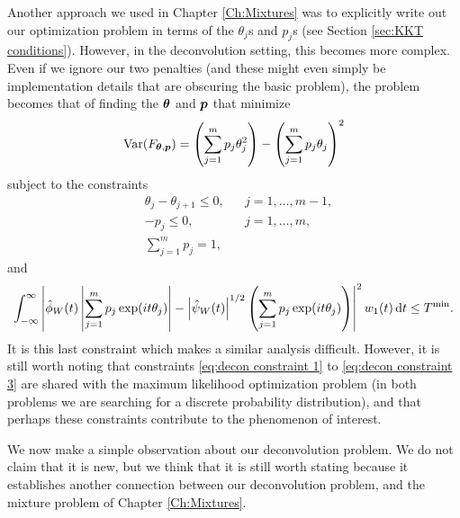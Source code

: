 Another approach we used in Chapter \ref{Ch:Mixtures} was to explicitly write out our optimization problem in terms of the $\theta_j$s and $p_j$s (see Section \ref{sec:KKT conditions}). However, in the deconvolution setting, this becomes more complex. Even if we ignore our two penalties (and these might even simply be implementation details that are obscuring the basic problem), the problem becomes that of finding the ${\bm{{\theta}}}$ and ${\bm{{p}}}$ that minimize
\begin{equation}
	\mathrm{Var}(F_{{\bm{{\theta}}}, {\bm{{p}}}}) = \left(\sum_{j =1}^m p_j \theta_j^2 \right) - \left(\sum_{j = 1}^m p_j \theta_j \right)^2
\end{equation}
subject to the constraints
\begin{align}
	&\theta_j -\theta_{j+1} \leq 0, &&j=1,\dots,m-1,	\label{eq:decon constraint 1}\\
	&-p_j \leq 0, &&j=1,\dots,m,	\label{eq:decon constraint 2} \\
	&\sum_{j=1}^m p_j = 1,
	\label{eq:decon constraint 3}
\end{align}
and
\begin{equation}
	\int_{-\infty}^\infty \left| \hat{\phi}_W(t) \left|\sum_{j = 1}^m p_j \exp(it\theta_j)\right| - \left|\hat{\psi}_W(t)\right|^{1/2} \left(\sum_{j = 1}^m p_j \exp(it\theta_j) \right)\right|^2 w_1(t) \, \mathrm{d} t \leq T^\mathrm{min}.
\end{equation}
It is this last constraint which makes a similar analysis difficult. However, it is still worth noting that constraints \eqref{eq:decon constraint 1} to \eqref{eq:decon constraint 3} are shared with the maximum likelihood optimization problem (in both problems we are searching for a discrete probability distribution), and that perhaps these constraints contribute to the phenomenon of interest.



We now make a simple observation about our deconvolution problem. We do not claim that it is new, but we think that it is still worth stating because it establishes another connection between our deconvolution problem, and the mixture problem of Chapter \ref{Ch:Mixtures}.

